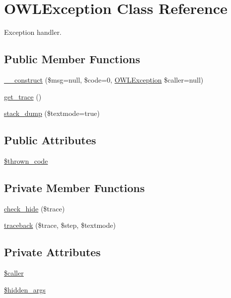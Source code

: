 \section{OWLException Class Reference}
\label{classOWLException}


Exception handler.  


\subsection*{Public Member Functions}
\begin{DoxyCompactItemize}
\item 
\hyperlink{classOWLException_a02821b324b42b7818c3fefe7638444e7}{\_\-\_\-construct} (\$msg=null, \$code=0, \hyperlink{classOWLException}{OWLException} \$caller=null)
\item 
\hyperlink{classOWLException_abec096884c369f08040443561ac3b164}{get\_\-trace} ()
\item 
\hyperlink{classOWLException_acf2b94859fdebcefc22e8a75ac1a670d}{stack\_\-dump} (\$textmode=true)
\end{DoxyCompactItemize}
\subsection*{Public Attributes}
\begin{DoxyCompactItemize}
\item 
\hyperlink{classOWLException_abd34d579d5f578f2e08a04c987dbea1a}{\$thrown\_\-code}
\end{DoxyCompactItemize}
\subsection*{Private Member Functions}
\begin{DoxyCompactItemize}
\item 
\hyperlink{classOWLException_ad5e675e393079574ff85ac862262baa0}{check\_\-hide} (\$trace)
\item 
\hyperlink{classOWLException_a6e857cc079ee29428791e4926fe1677a}{traceback} (\$trace, \$step, \$textmode)
\end{DoxyCompactItemize}
\subsection*{Private Attributes}
\begin{DoxyCompactItemize}
\item 
\hyperlink{classOWLException_af59d0890c1de1187f43084ec617545f1}{\$caller}
\item 
\hyperlink{classOWLException_a6f55c054dd20e494abe9db9a9494bdda}{\$hidden\_\-args}
\end{DoxyCompactItemize}


